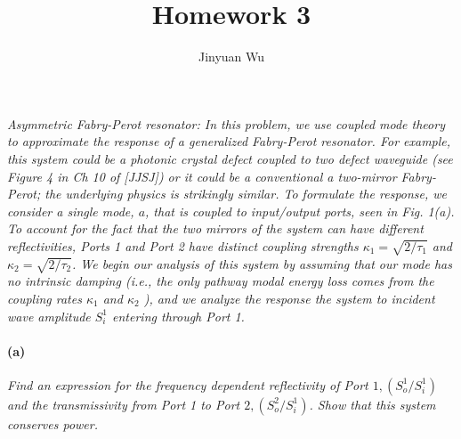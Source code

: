 \documentclass[hyperref, a4paper]{article}
\title{Homework 3}
\author{Jinyuan Wu}
\begin{document}
\maketitle

\section{}

\subsection{}

\textit{Asymmetric Fabry-Perot resonator: In this problem, we use coupled mode theory to approximate the response of a generalized Fabry-Perot resonator. For example, this system could be a photonic crystal defect coupled to two defect waveguide (see Figure 4 in Ch 10 of [JJSJ]) or it could be a conventional a two-mirror Fabry-Perot; the underlying physics is strikingly similar. To formulate the response, we consider a single mode, $a$, that is coupled to input/output ports, seen in Fig. 1(a). To account for the fact that the two mirrors of the system can have different reflectivities, Ports 1 and Port 2 have distinct coupling strengths $\kappa_1=\sqrt{2 / \tau_1}$ and $\kappa_2=\sqrt{2 / \tau_2}$. We begin our analysis of this system by assuming that our mode has no intrinsic damping (i.e., the only pathway modal energy loss comes from the coupling rates $\kappa_1$ and $\kappa_2$ ), and we analyze the response the system to incident wave amplitude $S_i^1$ entering through Port 1.
}

\paragraph*{(a)} \textit{Find an expression for the frequency dependent reflectivity of Port $1,\left(S_o^1 / S_i^1\right)$ and the transmissivity from Port 1 to Port $2,\left(S_o^2 / S_i^1\right)$. Show that this system conserves power.} 
\end{document}
